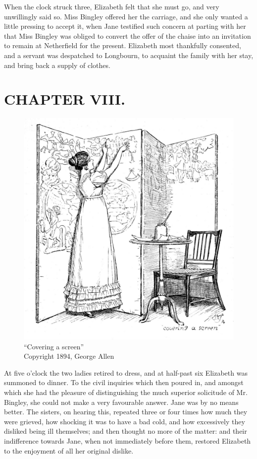 When the clock struck three, Elizabeth felt that she must go, and very unwillingly said so. Miss Bingley offered her the carriage, and she only wanted a little pressing to accept it, when Jane testified such concern at parting with her that Miss Bingley was obliged to convert the offer of the chaise into an invitation to remain at Netherfield for the present. Elizabeth most thankfully consented, and a servant was despatched to Longbourn, to acquaint the family with her stay, and bring back a supply of clothes.


\chapter{CHAPTER VIII.}

\begin{figure}[htbp]
    \centering
    \includegraphics[width=\textwidth]{illustrations/i_074_a.jpg}
    \caption{“Covering a screen”\\ Copyright 1894, George Allen}
    \label{fig:image}
\end{figure}


At five o'clock the two ladies retired to dress, and at half-past six Elizabeth was summoned to dinner. To the civil inquiries which then poured in, and amongst which she had the pleasure of distinguishing the much superior solicitude of Mr. Bingley, she could not make a very favourable answer. Jane was by no means better. The sisters, on hearing this, repeated three or four times how much they were grieved, how shocking it was to have a bad cold, and how excessively they disliked being ill themselves; and then thought no more of the matter: and their indifference towards Jane, when not immediately before them, restored Elizabeth to the enjoyment of all her original dislike.

